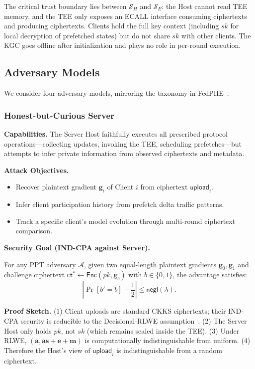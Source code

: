 The critical trust boundary lies between $\mathcal{S}_H$ and $\mathcal{S}_E$: the Host cannot read TEE memory, and the TEE only exposes an ECALL interface consuming ciphertexts and producing ciphertexts. Clients hold the full key context (including $sk$ for local decryption of prefetched states) but do not share $sk$ with other clients. The KGC goes offline after initialization and plays no role in per-round execution.

\subsection{Adversary Models}

We consider four adversary models, mirroring the taxonomy in FedPHE~\cite{li2025fedphe}.

\subsubsection{Honest-but-Curious Server}

\textbf{Capabilities.} The Server Host faithfully executes all prescribed protocol operations---collecting updates, invoking the TEE, scheduling prefetches---but attempts to infer private information from observed ciphertexts and metadata.

\textbf{Attack Objectives.}
\begin{itemize}
    \item Recover plaintext gradient $\mathbf{g}_i$ of Client $i$ from ciphertext $\textsf{upload}_i$.
    \item Infer client participation history from prefetch delta traffic patterns.
    \item Track a specific client's model evolution through multi-round ciphertext comparison.
\end{itemize}

\textbf{Security Goal (IND-CPA against Server).}
\begin{definition}
For any PPT adversary $\mathcal{A}$, given two equal-length plaintext gradients $\mathbf{g}_0, \mathbf{g}_1$ and challenge ciphertext $\textsf{ct}^* \leftarrow \textsf{Enc}(pk, \mathbf{g}_b)$ with $b \in \{0,1\}$, the advantage satisfies:
\begin{equation}
\left| \Pr[b' = b] - \frac{1}{2} \right| \leq \textsf{negl}(\lambda).
\end{equation}
\end{definition}

\textbf{Proof Sketch.}
(1) Client uploads are standard CKKS ciphertexts; their IND-CPA security is reducible to the Decisional-RLWE assumption~\cite{cheon2017homomorphic}. (2) The Server Host only holds $pk$, not $sk$ (which remains sealed inside the TEE). (3) Under RLWE, $(\mathbf{a}, \mathbf{a}\mathbf{s} + \mathbf{e} + \mathbf{m})$ is computationally indistinguishable from uniform. (4) Therefore the Host's view of $\textsf{upload}_i$ is indistinguishable from a random ciphertext.

